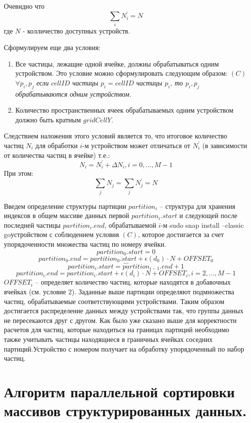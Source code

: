 Очевидно что
\[
  \sum_{i}N_{i}^{'} = N
\]
где \(N\) - колличество доступных устройств.


Сформулируем еще два условия:
\noindent
\begin{enumerate}
  \item Все частицы, лежащие одной ячейке, должны обрабатываться одним устройством. Это условие можно сформулировать следующим образом:
        \((C)\) \(\forall p_i, p_j\) \textit{если \(cellID\) частицы \(p_i=cellID\) частицы \(p_i\), то \(p_i, p_j\) обрабатываются одним устройством.}
  \item Количество пространственных ячеек обрабатываемых одним устройством должно быть кратным \(gridCellY\).
\end{enumerate}

Следствием наложения этого условий является то, что итоговое количество частиц \(N_i \) для обработки \(i\)-м устройством  может отличаться от \(N_{i}^{'}\) (в зависимости от количества частиц в ячейке) т.е.:
\[
  N_i = N_{i}^{'}+\Delta N_i, i=0,..., M-1
\]
При этом:
\[
  \sum_{j} N_j = \sum_{j}N_{j}^{'}=N
\]

Введем определение структуры партиции \(partition_i\) – структура для хранения индексов в общем массиве данных первой \(partition_{i}.start\) и следующей после последней частицы \(partition_{i}.end\), обрабатываемой \(i\)-м sudo snap install --classic goустройством с соблюдением условия
\((C)\), которое достигается за счет упорядоченности множества частиц по номеру ячейки.
\[
  partition_{0}.start = 0
\]
\[
  partition_{0}.end = partition_{0}.start + \epsilon (d_0) \cdot N + OFFSET_0
\]
\[
  ...
\]
\[
  partition_{i}.start = partition_{i-1}.end + 1
\]
\[
  partition_{i}.end = partition_{i}.start + \epsilon (d_i) \cdot N + OFFSET_i, i=2,..., M - 1
\]
\(OFFSET_i\) – определяет количество частиц, которые находятся в добавочных ячейках (см. условие 2).
Заданные выше партиции определяют подмножества частиц, обрабатываемые соответствующими устройствами. Таким образом достигается распределение данных между устройствами так, что группы данных не пересекаются друг с другом. Как было уже сказано выше для корректности расчетов для частиц, которые находиться на границах партиций необходимо также учитывать частицы находящиеся в граничных ячейках соседних партиций.Устройство с номером  получает на обработку упорядоченный по  набор частиц. 

\section{Алгоритм параллельной сортировки массивов структурированных данных.}\label{sec:ch3/sect2}

